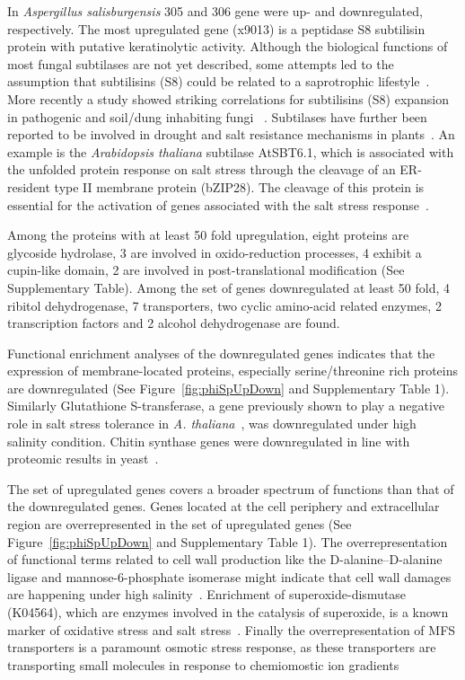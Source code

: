 \documentclass[jof,article,submit,moreauthors,pdftex,10pt,a4paper]{Definitions/mdpi}
\newcommand{\phiSp}{\textit{Aspergillus salisburgensis}}
\begin{document}
In \phiSp{} 305 and 306 gene were up- and downregulated, respectively. The most upregulated gene (x9013) is a peptidase S8 subtilisin protein with putative keratinolytic activity. Although the biological functions of most fungal subtilases are not yet described, some attempts led to the assumption that subtilisins (S8) could be related to a saprotrophic lifestyle~\cite{Leger1997}. More recently a study showed striking correlations for subtilisins (S8) expansion in pathogenic and soil/dung inhabiting fungi ~\cite{Muszewska2017FungalRepertoire}.  Subtilases have further been reported to be involved in drought and salt resistance mechanisms in plants~\cite{Liu2007}. An  example is the \textit{Arabidopsis thaliana} subtilase AtSBT6.1, which is associated with the unfolded protein response on salt stress through the cleavage of an ER-resident type II membrane protein (bZIP28). The cleavage of this protein is essential for the activation of genes associated with the salt stress response~\cite{Figueiredo2018}. 

Among the proteins with at least 50 fold upregulation, eight proteins are glycoside hydrolase, 3 are involved in oxido-reduction processes, 4 exhibit a cupin-like domain, 2 are involved in post-translational modification (See Supplementary Table). Among the set of genes downregulated at least 50 fold, 4 ribitol dehydrogenase, 7 transporters, two cyclic amino-acid related enzymes,  2 transcription factors and 2 alcohol dehydrogenase are found. 

Functional enrichment analyses of the downregulated genes indicates that the expression of membrane-located proteins, especially serine/threonine rich proteins are downregulated (See Figure~\ref{fig:phiSpUpDown} and Supplementary Table 1). Similarly Glutathione S-transferase, a gene previously shown to play a negative role in salt stress tolerance in \textit{A. thaliana}~\cite{Chen2012}, was downregulated under high salinity condition. Chitin synthase genes were downregulated in line with proteomic results in yeast~\cite{Szopinska2011}.

The set of upregulated genes covers a broader spectrum of functions than that of the downregulated genes. Genes located at the cell periphery and extracellular region are overrepresented in the set of upregulated genes (See Figure~\ref{fig:phiSpUpDown} and Supplementary Table 1). The overrepresentation of functional terms related to cell wall production like the D-alanine--D-alanine ligase and mannose-6-phosphate isomerase might indicate that cell wall damages are happening under high salinity~\cite{Ene2015}. Enrichment of superoxide-dismutase (K04564), which are enzymes involved in the catalysis of superoxide, is a known marker of oxidative stress and salt stress~\cite{Gostincar2018}. Finally the overrepresentation of MFS transporters is a paramount osmotic stress response, as these transporters are transporting small molecules in response to chemiomostic ion gradients~\cite{Pao1998}
\end{document}
